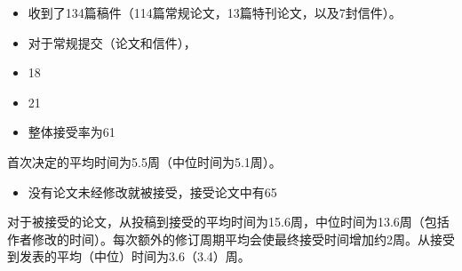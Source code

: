 \begin{itemize}
\item 收到了134篇稿件（114篇常规论文，13篇特刊论文，以及7封信件）。
\item 对于常规提交（论文和信件），



\item 18%
\item 21%
\item 整体接受率为61%
\end{itemize}

首次决定的平均时间为5.5周（中位时间为5.1周）。

\begin{itemize}
\item 没有论文未经修改就被接受，接受论文中有65%
\end{itemize}

对于被接受的论文，从投稿到接受的平均时间为15.6周，中位时间为13.6周（包括作者修改的时间）。每次额外的修订周期平均会使最终接受时间增加约2周。从接受到发表的平均（中位）时间为3.6（3.4）周。

